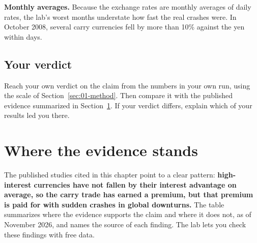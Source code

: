 \textbf{Monthly averages.} Because the exchange rates are monthly averages of daily rates, the lab's worst months understate how fast the real crashes were. In October 2008, several carry currencies fell by more than 10\% against the yen within days.

\subsection*{Your verdict}

Reach your own verdict on the claim from the numbers in your own run, using the scale of Section~\ref{sec:01-method}. Then compare it with the published evidence summarized in Section~\ref{sec:06-verdict}. If your verdict differs, explain which of your results led you there.

\section{Where the evidence stands}
\label{sec:06-verdict}

The published studies cited in this chapter point to a clear pattern: \textbf{high-interest currencies have not fallen by their interest advantage on average, so the carry trade has earned a premium, but that premium is paid for with sudden crashes in global downturns.} The table summarizes where the evidence supports the claim and where it does not, as of November 2026, and names the source of each finding. The lab lets you check these findings with free data.


